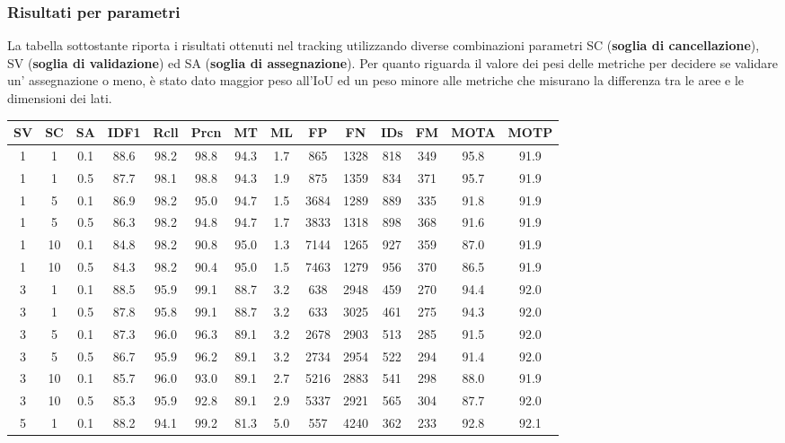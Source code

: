 \subsubsection{Risultati per parametri}
La tabella sottostante riporta i risultati ottenuti nel tracking  utilizzando diverse combinazioni parametri SC (\textbf{soglia di cancellazione}), SV (\textbf{soglia di validazione}) ed SA (\textbf{soglia di assegnazione}). Per quanto riguarda il valore dei pesi delle metriche per decidere se validare un' assegnazione o meno, è stato dato maggior peso all'IoU ed un peso minore alle metriche che misurano la differenza tra le aree e le dimensioni dei lati.
\begin{table}[h!]
\centering
\begin{tabular}{|c|c|c|c|c|c|c|c|c|c|c|c|c|c|}
\hline
SV & SC & SA & IDF1 & Rcll & Prcn & MT & ML & FP & FN & IDs & FM & MOTA & MOTP\\ [0.5ex] 
\hline
1 & 1 & 0.1 & 88.6 & 98.2 & 98.8 & 94.3 & 1.7 & 865 & 1328 & 818 & 349 & 95.8 & 91.9\\
1 & 1 & 0.5 & 87.7 & 98.1 & 98.8 & 94.3 & 1.9 & 875 & 1359 & 834 & 371 & 95.7 & 91.9\\
1 & 5 & 0.1 & 86.9 & 98.2 & 95.0 & 94.7 & 1.5 & 3684 & 1289 & 889 & 335 & 91.8 & 91.9\\
1 & 5 & 0.5 & 86.3 & 98.2 & 94.8 & 94.7 & 1.7 & 3833 & 1318 & 898 & 368 & 91.6 & 91.9\\
1 & 10 & 0.1 & 84.8 & 98.2 & 90.8 & 95.0 & 1.3 & 7144 & 1265 & 927 & 359 & 87.0 & 91.9\\
1 & 10 & 0.5 & 84.3 & 98.2 & 90.4 & 95.0 & 1.5 & 7463 & 1279 & 956 & 370 & 86.5 & 91.9\\
3 & 1 & 0.1 & 88.5 & 95.9 & 99.1 & 88.7 & 3.2 & 638 & 2948 & 459 & 270 & 94.4 & 92.0\\
3 & 1 & 0.5 & 87.8 & 95.8 & 99.1 & 88.7 & 3.2 & 633 & 3025 & 461 & 275 & 94.3 & 92.0\\
3 & 5 & 0.1 & 87.3 & 96.0 & 96.3 & 89.1 & 3.2 & 2678 & 2903 & 513 & 285 & 91.5 & 92.0\\
3 & 5 & 0.5 & 86.7 & 95.9 & 96.2 & 89.1 & 3.2 & 2734 & 2954 & 522 & 294 & 91.4 & 92.0\\
3 & 10 & 0.1 & 85.7 & 96.0 & 93.0 & 89.1 & 2.7 & 5216 & 2883 & 541 & 298 & 88.0 & 91.9\\
3 & 10 & 0.5 & 85.3 & 95.9 & 92.8 & 89.1 & 2.9 & 5337 & 2921 & 565 & 304 & 87.7 & 92.0\\
5 & 1 & 0.1 & 88.2 & 94.1 & 99.2 & 81.3 & 5.0 & 557 & 4240 & 362 & 233 & 92.8 & 92.1\\

\end{tabular}
\end{table}
